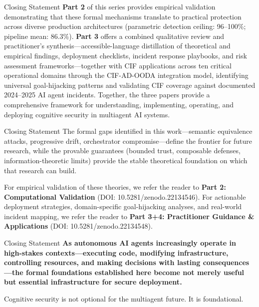 \documentclass[
  ignorenonframetext,
]{beamer}
\begin{document}
\begin{frame}[allowframebreaks]{Closing Statement}
\textbf{Part 2} of this series provides empirical validation
demonstrating that these formal mechanisms translate to practical
protection across diverse production architectures (parametric detection
ceiling: 96--100\%; pipeline mean: 86.3\%). \textbf{Part 3} offers a
combined qualitative review and practitioner's
synthesis---accessible-language distillation of theoretical and
empirical findings, deployment checklists, incident response playbooks,
and risk assessment frameworks---together with CIF applications across
ten critical operational domains through the CIF-AD-OODA integration
model, identifying universal goal-hijacking patterns and validating CIF
coverage against documented 2024--2025 AI agent incidents. Together, the
three papers provide a comprehensive framework for understanding,
implementing, operating, and deploying cognitive security in multiagent
AI systems.

\end{frame}

\begin{frame}[allowframebreaks]{Closing Statement}
The formal gaps identified in this work---semantic equivalence attacks,
progressive drift, orchestrator compromise---define the frontier for
future research, while the provable guarantees (bounded trust,
composable defenses, information-theoretic limits) provide the stable
theoretical foundation on which that research can build.

For empirical validation of these theories, we refer the reader to
\textbf{Part 2: Computational Validation} (DOI:
10.5281/zenodo.22134546). For actionable deployment strategies,
domain-specific goal-hijacking analyses, and real-world incident
mapping, we refer the reader to \textbf{Part 3+4: Practitioner Guidance
\& Applications} (DOI: 10.5281/zenodo.22134548).

\end{frame}

\begin{frame}[allowframebreaks]{Closing Statement}
\textbf{As autonomous AI agents increasingly operate in high-stakes contexts---executing code, modifying infrastructure, controlling resources, and making decisions with lasting consequences---the formal foundations established here become not merely useful but essential infrastructure for secure deployment.}

Cognitive security is not optional for the multiagent future. It is
foundational.
\end{frame}
\end{document}
